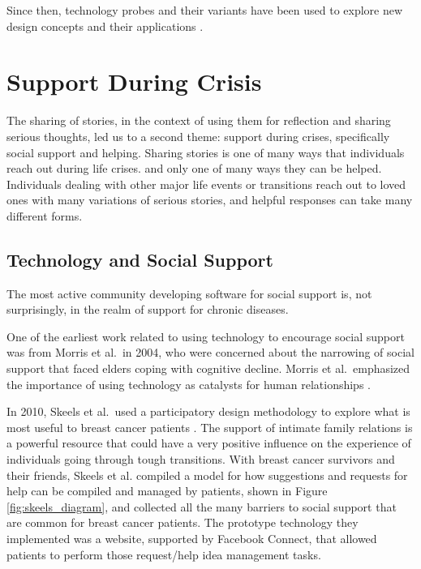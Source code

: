     Since then, technology probes and their variants have been used to explore
    new design concepts and their applications \cite{vetere05, lottridge09}.

\section{Support During Crisis}
  The sharing of stories,
  in the context of using them for reflection and sharing serious thoughts,
  led us to a second theme:
  support during crises,
  specifically social support and helping.
  Sharing stories is one of many ways that
  individuals reach out during life crises.
  and only one of many ways they can be helped.
  Individuals dealing with other major life events or transitions
  reach out to loved ones with many variations of serious stories,
  and helpful responses can take many different forms.

  \subsection{Technology and Social Support}
    The most active community developing software for social support is,
    not surprisingly, in the realm of support for chronic diseases.

    One of the earliest work related to using technology to encourage social
    support was from Morris et al.\ in 2004,
    who were concerned about the narrowing of social support that faced
    elders coping with cognitive decline.
    Morris et al.\ emphasized the importance of using technology
    as catalysts for human relationships
    \cite{morris04}.

    In 2010, Skeels et al.\ used a participatory design methodology to explore what is most useful
    to breast cancer patients
    \cite{skeels10}.
    The support of intimate family relations is a powerful
    resource that could
    have a very positive influence on the experience of individuals going through
    tough transitions.
    With breast cancer survivors and their friends, Skeels et al. compiled a model for how
    suggestions and requests for help can be compiled and managed by patients,
    shown in Figure \ref{fig:skeels_diagram},
    and collected all the many barriers to social support that are common for breast cancer patients.
    The prototype technology they implemented was a website, supported by Facebook Connect,
    that allowed patients to perform those request/help idea management tasks.

